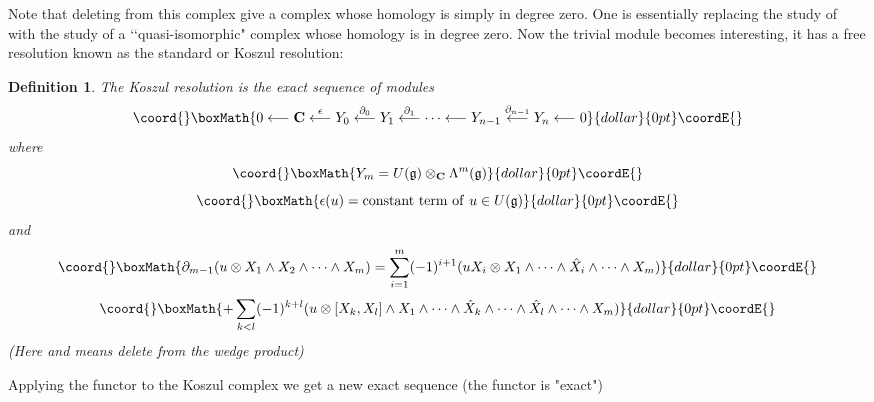 \documentclass[a4paper,a4paper]{article}
\newtheorem{define}{Definition}
\theoremstyle{conjecture}
\begin{document}
Note that deleting \coordHE{} from this complex give a complex whose homology is simply
\coordHE{} in degree zero.  One is essentially replacing the study of \coordHE{} with the study
of a \lq\lq quasi-isomorphic" complex whose homology is \coordHE{} in degree zero.  Now the trivial \coordHE{}
module \coordHE{}
becomes interesting, it has a free resolution known as the standard or Koszul
resolution:
\begin{define}
The Koszul resolution is the exact sequence of \coordHE{} modules
$$\coord{}\boxMath{0\longleftarrow\mathbf C\stackrel{\epsilon}\longleftarrow Y_0\stackrel{\partial_0}\longleftarrow Y_1
\stackrel{\partial_1}\longleftarrow\cdots\longleftarrow Y_{n-1}\stackrel{\partial_{n-1}}\longleftarrow Y_n
\longleftarrow 0}{dollar}{0pt}\coordE{}$$
where
$$\coord{}\boxMath{Y_m=U(\mathfrak g)\otimes_{\mathbf C}\Lambda^m(\mathfrak g)}{dollar}{0pt}\coordE{}$$  $$\coord{}\boxMath{\epsilon(u)= {\mathrm {constant\ term\ of\ }}u\in U(\mathfrak g)}{dollar}{0pt}\coordE{}$$
and
$$\coord{}\boxMath{\partial_{m-1}(u\otimes X_1\wedge X_2\wedge\cdots\wedge X_m)=\sum_{i=1}^{m}
(-1)^{i+1}(uX_i\otimes X_1\wedge\cdots\wedge\hat X_i\wedge\cdots\wedge X_m)}{dollar}{0pt}\coordE{}$$  $$\coord{}\boxMath{+\sum_{k<l}(-1)^{k+l}(u\otimes[X_k,X_l]\wedge X_1\wedge\cdots
\wedge \hat X_k\wedge\cdots \wedge \hat X_l\wedge\cdots \wedge X_m)}{dollar}{0pt}\coordE{}$$
(Here \coordHE{} and \coordHE{} means delete \coordHE{} from the wedge product)

\end{define}

Applying the functor \coordHE{} to
the Koszul complex we get a new exact sequence (the functor is "exact")
\end{document}
